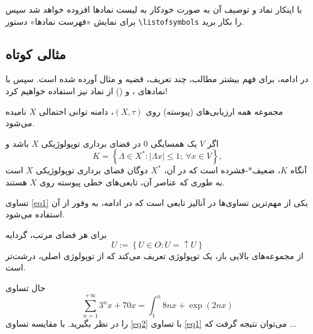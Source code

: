     با اینکار نماد و توصیف آن به صورت خودکار به لیست نمادها افزوده خواهد شد 
    سپس برای نمایش «فهرست نمادها»  دستور \Verb+\listofsymbols+ را بکار برید. 

    \subsection{مثالی کوتاه}
    \label{sec:shortexp}
        
    در ادامه، برای فهم بیشتر مطالب، چند تعریف، قضیه و مثال آورده شده است.  سپس با نمادهای 
    ،‌  و   ()
    از نماد 
     نیز استفاده خواهیم کرد!

    
    \begin{definition}
    مجموعه همه ارزیابی‌های  (پیوسته)  روی $(X,\tau)$، دامنه توانی احتمالی
    $ X $
    نامیده می‌شود.
    \end{definition}
    \begin{theorem}
    اگر $ V $ یک همسایگی $ 0 $ در فضای برداری 
     توپولوژیکی $ X $ باشد و 
    \begin{equation}\label{eq1}
    K=\left\lbrace \Lambda \in X^{*}:|\Lambda x|\leqslant 1 ; \ \forall x\in V\right\rbrace,
    \end{equation}
    آنگاه $ K $،  ضعیف*-فشرده است که در آن، $ X^{*} $ دوگان
     فضای برداری توپولوژیکی $ X $ است به ‌طوری که عناصر آن،  تابعی‌های 
    خطی پیوسته
     روی $X$ هستند.
    \end{theorem}
    تساوی \eqref{eq1} یکی از مهم‌ترین تساوی‌ها در آنالیز تابعی است که در ادامه، به وفور از آن استفاده می‌شود.
    \begin{example}
    برای هر فضای مرتب، گردایه 
    $$U:=\left\lbrace U\in O: U=\uparrow U\right\rbrace $$
    از مجموعه‌های بالایی باز، یک توپولوژی تعریف می‌کند که از توپولوژی اصلی، درشت‌تر  است.
    \end{example}
    حال تساوی 
    \begin{equation}\label{eq2}
    \sum_{n=1}^{+\infty} 3^{n}x+70x=\int_{1}^{n}8nx+\exp{(2nx)}
    \end{equation}
    را در نظر بگیرید. با مقایسه تساوی \eqref{eq2} با تساوی \eqref{eq1} می‌توان نتیجه گرفت که ...
    
